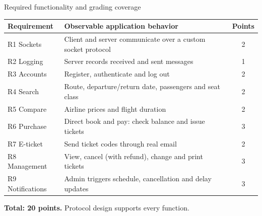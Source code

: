 \documentclass[t,aspectratio=169]{beamer}
\newcommand{\gap}{\par\vspace{0.18cm}}
\begin{document}
\begin{frame}{Required functionality and grading coverage}
\small
\begin{tabularx}{\textwidth}{@{}lYc@{}}
\toprule
\textbf{Requirement} & \textbf{Observable application behavior} & \textbf{Points}\\
\midrule
R1 Sockets & Client and server communicate over a custom socket protocol & 2\\
R2 Logging & Server records received and sent messages & 1\\
R3 Accounts & Register, authenticate and log out & 2\\
R4 Search & Route, departure/return date, passengers and seat class & 2\\
R5 Compare & Airline prices and flight duration & 2\\
R6 Purchase & Direct book and pay: check balance and issue tickets & 3\\
R7 E-ticket & Send ticket codes through real email & 2\\
R8 Management & View, cancel (with refund), change and print tickets & 3\\
R9 Notifications & Admin triggers schedule, cancellation and delay updates & 3\\
\bottomrule
\end{tabularx}
\gap
\textbf{Total: 20 points.} Protocol design supports every function.
\end{frame}
\end{document}
